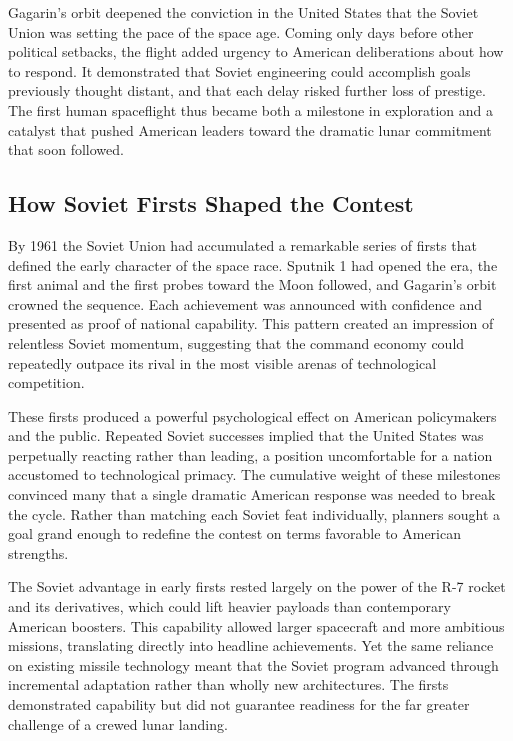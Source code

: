 Gagarin's orbit deepened the conviction in the United States that the Soviet Union was setting the pace of the space age. Coming only days before other political setbacks, the flight added urgency to American deliberations about how to respond. It demonstrated that Soviet engineering could accomplish goals previously thought distant, and that each delay risked further loss of prestige. The first human spaceflight thus became both a milestone in exploration and a catalyst that pushed American leaders toward the dramatic lunar commitment that soon followed. \cite{siddiqi2010} \cite{harford1997}

\subsection{How Soviet Firsts Shaped the Contest}
By 1961 the Soviet Union had accumulated a remarkable series of firsts that defined the early character of the space race. Sputnik 1 had opened the era, the first animal and the first probes toward the Moon followed, and Gagarin's orbit crowned the sequence. Each achievement was announced with confidence and presented as proof of national capability. This pattern created an impression of relentless Soviet momentum, suggesting that the command economy could repeatedly outpace its rival in the most visible arenas of technological competition.

These firsts produced a powerful psychological effect on American policymakers and the public. Repeated Soviet successes implied that the United States was perpetually reacting rather than leading, a position uncomfortable for a nation accustomed to technological primacy. The cumulative weight of these milestones convinced many that a single dramatic American response was needed to break the cycle. Rather than matching each Soviet feat individually, planners sought a goal grand enough to redefine the contest on terms favorable to American strengths.

The Soviet advantage in early firsts rested largely on the power of the R-7 rocket and its derivatives, which could lift heavier payloads than contemporary American boosters. This capability allowed larger spacecraft and more ambitious missions, translating directly into headline achievements. Yet the same reliance on existing missile technology meant that the Soviet program advanced through incremental adaptation rather than wholly new architectures. The firsts demonstrated capability but did not guarantee readiness for the far greater challenge of a crewed lunar landing.

